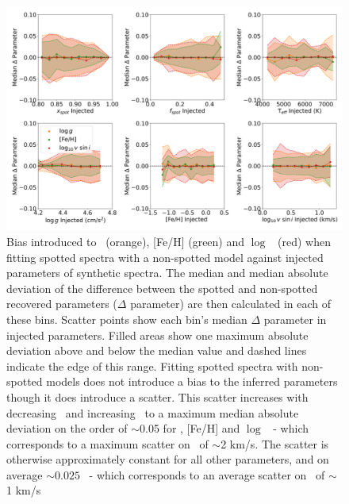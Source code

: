 \begin{figure}
    \includegraphics[width=\textwidth]{Figures/ss_chapter_figures/full_results.png}
    \caption{Bias introduced to \logg  \ (orange), [Fe/H] (green) and $\log$ \vsini\ (red) when fitting spotted spectra with a non-spotted model against injected parameters of synthetic spectra.  The median and median absolute deviation of the difference between the spotted and non-spotted recovered parameters ($\Delta$ parameter) are then calculated in each of these bins.
    Scatter points show each bin's median $\Delta$ parameter in injected parameters. Filled areas show one maximum absolute deviation above and below the median value and dashed lines indicate the edge of this range.
    Fitting spotted spectra with non-spotted models does not introduce a bias to the inferred parameters though it does introduce a scatter. This scatter increases with decreasing \xspot\ and increasing \fspot\ to a maximum median absolute deviation on the order of $\sim$0.05 for \logg, [Fe/H] and $\log$ \vsini \ - which corresponds to a maximum scatter on \vsini \ of $\sim$2 km/s.
    The scatter is otherwise approximately constant for all other parameters, and on average $\sim 0.025$ \ - which corresponds to an average scatter on \vsini \ of $\sim$ 1 km/s }
    \label{fig:res_full}
\end{figure}


